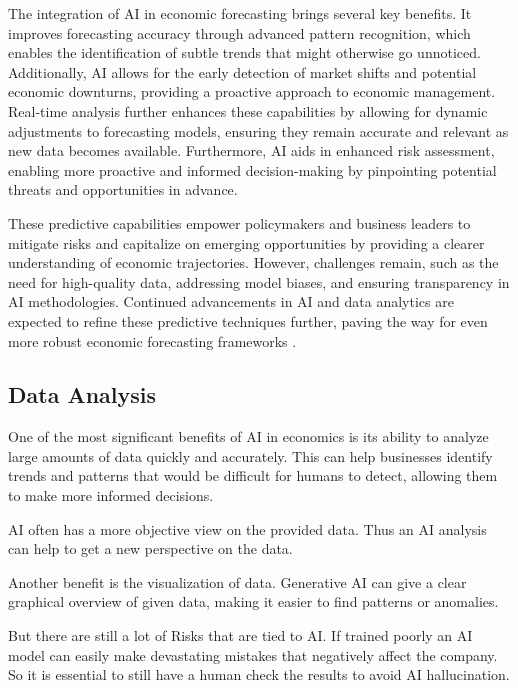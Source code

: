 The integration of AI in economic forecasting brings several key benefits. It improves forecasting accuracy through advanced pattern recognition, 
which enables the identification of subtle trends that might otherwise go unnoticed. Additionally, AI allows for the early detection of market shifts 
and potential economic downturns, providing a proactive approach to economic management. Real-time analysis further enhances these capabilities by 
allowing for dynamic adjustments to forecasting models, ensuring they remain accurate and relevant as new data becomes available. Furthermore, 
AI aids in enhanced risk assessment, enabling more proactive and informed decision-making by pinpointing potential threats and opportunities in advance.

These predictive capabilities empower policymakers and business leaders to mitigate risks and capitalize on emerging opportunities by providing a clearer understanding of economic trajectories. However, challenges remain, such as the need for high-quality data, addressing model biases, and ensuring transparency in AI methodologies. Continued advancements in AI and data analytics are expected to refine these predictive techniques further, paving the way for even more robust economic forecasting frameworks \cite{Predictive-Analysis-ai}.


\subsection{Data Analysis}
\label{subsec:data-analysis}

One of the most significant benefits of AI in economics is its ability to analyze large amounts of data quickly and accurately. 
This can help businesses identify trends and patterns that would be difficult for humans to detect, allowing them to make more informed decisions.

AI often has a more objective view on the provided data. Thus an AI analysis can help to get a new perspective on the data. 

Another benefit is the visualization of data. Generative AI can give a clear graphical overview of given data, making it easier to find patterns or anomalies. 

But there are still a lot of Risks that are tied to AI.
If trained poorly an AI model can easily make devastating mistakes that negatively affect the company.
So it is essential to still have a human check the results to avoid AI hallucination.

\cite{AiDataAnalysis}

